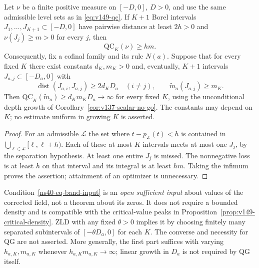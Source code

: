 \begin{proposition}
\label{ns40-prop-bands}
Let $\nu$ be a finite positive measure on $[-D,0]$, $D>0$, and
use the same admissible level sets as in \eqref{eq:v149-qc}.
If $K+1$ Borel intervals $J_1,\ldots,J_{K+1}\subset[-D,0]$ have
pairwise distance at least $2h>0$ and $\nu(J_j)\ge m>0$ for every
$j$, then
\begin{equation}\label{ns40-eq-band-cost}
                 \mathrm{QC}_K(\nu)\ge hm.
\end{equation}
Consequently, fix a cofinal family and its rule $N(a)$. Suppose that
for every fixed $K$ there exist constants $d_K,m_K>0$ and, eventually,
$K+1$ intervals $J_{a,j}\subset[-D_a,0]$ with
\begin{equation}\label{ns40-eq-band-input}
 \operatorname{dist}(J_{a,i},J_{a,j})\ge2d_KD_a\quad(i\ne j),
 \qquad \widetilde m_a(J_{a,j})\ge m_K.
\end{equation}
Then $\mathrm{QC}_K(\widetilde m_a)\ge d_Km_KD_a\to\infty$ for
every fixed $K$, using the unconditional depth growth of
Corollary~\ref{cor:v137-scalar-no-go}. The constants may depend on $K$;
no estimate uniform in growing $K$ is asserted.
\end{proposition}
\begin{proof}
For an admissible $\mathcal L$ the set where
$t-p_{\mathcal L}(t)<h$ is contained in
$\bigcup_{\ell\in\mathcal L}[\ell,\ell+h)$.
Each of these at most $K$ intervals meets at most one $J_j$, by
the separation hypothesis. At least one entire $J_j$ is missed.
The nonnegative loss is at least $h$ on that interval and its
integral is at least $hm$. Taking the infimum proves the assertion;
attainment of an optimizer is unnecessary.
\end{proof}

Condition~\eqref{ns40-eq-band-input} is an \emph{open sufficient input}
about values of the corrected field, not a theorem about its zeros.
It does not require a bounded density and is compatible with the
critical-value peaks in Proposition~\ref{prop:v149-critical-density}.
ZLD with any fixed $\theta>0$ implies it by choosing finitely many
separated subintervals of $[-\theta D_a,0]$ for each $K$.
The converse and necessity for QG are not asserted. More generally,
the first part suffices with varying $h_{a,K},m_{a,K}$ whenever
$h_{a,K}m_{a,K}\to\infty$; linear growth in $D_a$ is not required
by QG itself.

